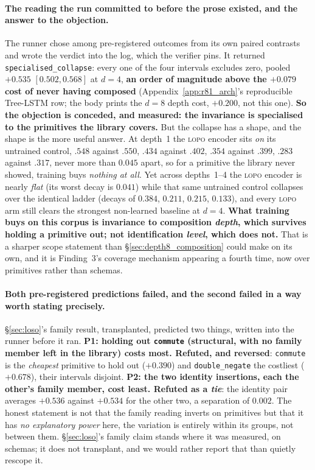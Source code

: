 \paragraph{The reading the run committed to before the prose existed, and the answer to the objection.} The runner chose among pre-registered outcomes from its own paired contrasts and wrote the verdict into the log, which the verifier pins. It returned \texttt{specialised\_collapse}: every one of the four intervals excludes zero, pooled $+0.535$ $[0.502,0.568]$ at $d{=}4$, \textbf{an order of magnitude above the $+0.079$ cost of never having composed} (Appendix~\ref{app:r81_arch}'s reproducible Tree-LSTM row; the body prints the $d{=}8$ depth cost, $+0.200$, not this one). \textbf{So the objection is conceded, and measured: the invariance is specialised to the primitives the library covers.} But the collapse has a shape, and the shape is the more useful answer. At depth~1 the \textsc{lopo} encoder sits \emph{on} its untrained control, $.548$ against $.550$, $.434$ against $.402$, $.354$ against $.399$, $.283$ against $.317$, never more than $0.045$ apart, so for a primitive the library never showed, training buys \emph{nothing at all}. Yet across depths~1--4 the \textsc{lopo} encoder is nearly \emph{flat} (its worst decay is $0.041$) while that same untrained control collapses over the identical ladder (decays of $0.384$, $0.211$, $0.215$, $0.133$), and every \textsc{lopo} arm still clears the strongest non-learned baseline at $d{=}4$. \textbf{What training buys on this corpus is invariance to composition \emph{depth}, which survives holding a primitive out; not identification \emph{level}, which does not.} That is a sharper scope statement than \S\ref{sec:depth8_composition} could make on its own, and it is Finding~3's coverage mechanism appearing a fourth time, now over primitives rather than schemas.

\paragraph{Both pre-registered predictions failed, and the second failed in a way worth stating precisely.} \S\ref{sec:loso}'s family result, transplanted, predicted two things, written into the runner before it ran. \textbf{P1: holding out \texttt{commute} (structural, with no family member left in the library) costs most. Refuted, and reversed}: \texttt{commute} is the \emph{cheapest} primitive to hold out ($+0.390$) and \texttt{double\_negate} the costliest ($+0.678$), their intervals disjoint. \textbf{P2: the two identity insertions, each the other's family member, cost least. Refuted as a \emph{tie}}: the identity pair averages $+0.536$ against $+0.534$ for the other two, a separation of $0.002$. The honest statement is not that the family reading inverts on primitives but that it has \emph{no explanatory power} here, the variation is entirely within its groups, not between them. \S\ref{sec:loso}'s family claim stands where it was measured, on schemas; it does not transplant, and we would rather report that than quietly rescope it.

